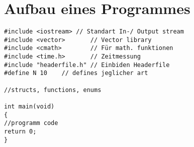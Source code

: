 \section{Aufbau eines Programmes}

\begin{lstlisting}
#include <iostream> // Standart In-/ Output stream
#include <vector>		// Vector library
#include <cmath>		// Für math. funktionen	
#include <time.h>		// Zeitmessung
#include "headerfile.h" // Einbiden Headerfile
#define N 10	// defines jeglicher art

//structs, functions, enums

int main(void)
{
//programm code
return 0;
}
\end{lstlisting}

